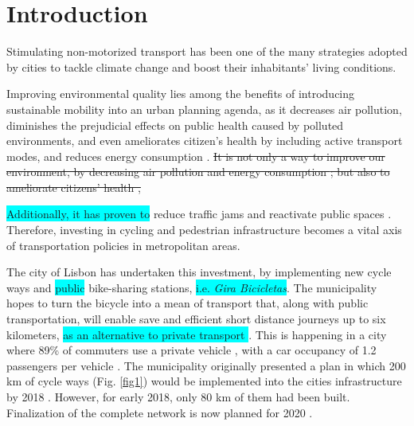 \documentclass[information,article,submit,moreauthors,pdftex,10pt,a4paper]{mdpi}
\theoremstyle{mdpi}
\newcounter{ex}
\newcounter{re}
\theoremstyle{mdpidefinition}
\begin{document}


\section{Introduction}

Stimulating non-motorized transport has been one of the many strategies adopted by cities to tackle climate change \cite{Banister2011} and boost their inhabitants' living conditions. 
\begin{mycolorbox}[colback=cyan]
Improving environmental quality lies among the benefits of introducing sustainable mobility into an urban planning agenda, as it decreases air pollution, diminishes the prejudicial effects on public health caused by polluted environments, and even ameliorates citizen's health by including active transport modes, and reduces energy consumption \cite{Fraser2011,DeHartog2010,Torres2018,Carley2017,Bopp2018}. \sout{It is not only a way to improve our environment, by decreasing air pollution and energy consumption \cite{Fraser2011}; but also to ameliorate citizens' health \cite{DeHartog2010},} 
\end{mycolorbox}
\colorbox{cyan}{Additionally, it has proven to} reduce traffic jams \cite{Kosha2016} and reactivate public spaces \cite{DeManuelJerez2016}. Therefore, investing in cycling and pedestrian infrastructure becomes a vital axis of transportation policies in metropolitan areas.

The city of Lisbon has undertaken this investment, by implementing new cycle ways and \colorbox{cyan}{public} bike-sharing stations, \colorbox{cyan}{i.e. \textit{Gira Bicicletas}}. The municipality hopes to turn the bicycle into a mean of transport that, along with public transportation, will enable save and efficient short distance journeys up to six kilometers, \colorbox{cyan}{as an alternative to private transport \cite{CamaraMunicipaldeLisboa,Marrana2018}}. This is happening in a city where 89\% of commuters use a private vehicle \cite{CamaraMunicipaldeLisboa2016}, with a car occupancy of 1.2 passengers per vehicle \cite{Silva2017}. The municipality originally presented a plan in which 200 km of cycle ways (Fig. \ref{fig1}) would be implemented into the cities infrastructure by 2018 \cite{Susete2016}. However, for early 2018, only 80 km of them had been built. Finalization of the complete network is now planned for 2020 \cite{Andre2018}.
\end{document}
